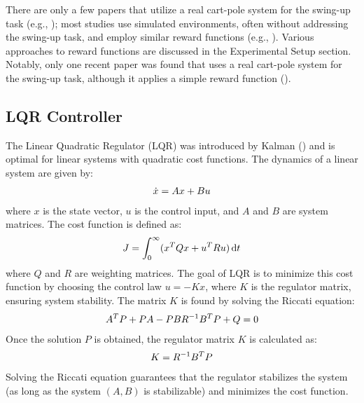 There are only a few papers that utilize a real cart-pole system for the swing-up task (e.g., \cite{nayante_reinforcement_2021, pilcolearner_cart-pole_2011, deisenroth_pilco_2011}); most studies use simulated environments, often without addressing the swing-up task, and employ similar reward functions (e.g., \cite{kumar_balancing_2020, liu_swing-up_2023, kimura_stochastic_1999}). Various approaches to reward functions are discussed in the Experimental Setup section. Notably, only one recent paper was found that uses a real cart-pole system for the swing-up task, although it applies a simple reward function (\cite{nayante_reinforcement_2021}).

\subsection{LQR Controller}

The Linear Quadratic Regulator (LQR) was introduced by Kalman (\citeyear{kalman_contributions_1960}) and is optimal for linear systems with quadratic cost functions. The dynamics of a linear system are given by:
\begin{align}
    \dot{x} = Ax + Bu \notag
\end{align}
where $x$ is the state vector, $u$ is the control input, and $A$ and $B$ are system matrices. The cost function is defined as:
\begin{align}
    J = \int_0^\infty (x^T Q x + u^T R u) \,\mathrm{d}t \notag
\end{align}
where $Q$ and $R$ are weighting matrices. The goal of LQR is to minimize this cost function by choosing the control law $u = -Kx$, where $K$ is the regulator matrix, ensuring system stability. The matrix $K$ is found by solving the Riccati equation:
\begin{align}
    A^T P + PA - PBR^{-1}B^T P + Q = 0 \notag
\end{align}
Once the solution $P$ is obtained, the regulator matrix $K$ is calculated as:
\begin{align}
    K = R^{-1}B^T P \notag
\end{align}
Solving the Riccati equation guarantees that the regulator stabilizes the system (as long as the system $(A, B)$ is stabilizable) and minimizes the cost function.

